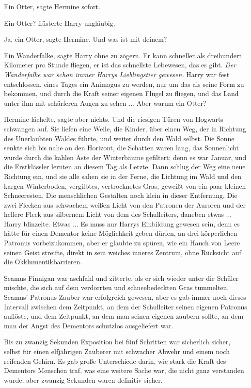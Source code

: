 \glqq{}Ein Otter\grqq{}, sagte Hermine sofort.

\glqq{}Ein Otter?\grqq{} flüsterte Harry ungläubig.

\glqq{}Ja, ein Otter\grqq{}, sagte Hermine. \glqq{}Und was ist mit deinem?\grqq{}

\glqq{}Ein Wanderfalke\grqq{}, sagte Harry ohne zu zögern. \glqq{}Er kann
schneller als dreihundert Kilometer pro Stunde fliegen, er ist das schnellste
Lebewesen, das es gibt.\grqq{}
\emph{Der Wanderfalke war schon immer Harrys Lieblingstier gewesen.}
Harry war fest entschlossen, eines Tages ein Animagus zu werden, nur um das als
seine Form zu bekommen, und durch die Kraft seiner eigenen Flügel zu fliegen,
und das Land unter ihm mit schärferen Augen zu sehen ... \glqq{}Aber warum ein
Otter?\grqq{}

Hermine lächelte, sagte aber nichts. Und die riesigen Türen von Hogwarts
schwangen auf. Sie liefen eine Weile, die Kinder, über einen Weg, der in
Richtung des Unerlaubten Waldes führte, und weiter durch den Wald selbst. Die
Sonne senkte sich bis nahe an den Horizont, die Schatten waren lang, das
Sonnenlicht wurde durch die kahlen Äste der Winterbäume gefiltert; denn es war
Januar, und die Erstklässler lernten an diesem Tag als Letzte. Dann schlug der
Weg eine neue Richtung ein, und sie alle sahen sie in der Ferne, die Lichtung im
Wald und den kargen Winterboden, vergilbtes, vertrocknetes Gras, geweißt von ein
paar kleinen Schneeresten. Die menschlichen Gestalten noch klein in dieser
Entfernung. Die zwei Flecken aus schwachem weißen Licht von den Patronen der
Auroren und der hellere Fleck aus silbernem Licht von dem des Schulleiters,
daneben etwas ... Harry blinzelte. Etwas ... Es muss nur Harrys Einbildung gewesen
sein, denn es hätte für einen Dementor keine Möglichkeit geben dürfen, an drei
körperlichen Patronus vorbeizukommen, aber er glaubte zu spüren, wie ein Hauch
von Leere seinen Geist streifte, direkt in sein weiches inneres Zentrum, ohne
Rücksicht auf die Okklumentikbarrieren.

Seamus Finnigan war aschfahl und zitterte, als er sich wieder unter die Schüler
mischte, die sich auf dem verdorrten und schneebedeckten Gras tummelten. Seamus'
Patronus-Zauber war erfolgreich gewesen, aber es gab immer noch dieses Intervall
zwischen dem Zeitpunkt, an dem der Schulleiter seinen eigenen Patronus auflöste,
und dem Zeitpunkt, an dem man seinen eigenen zaubern sollte, an dem man der
Angst des Dementors schutzlos ausgeliefert war.

Bis zu zwanzig Sekunden Exposition bei fünf Schritten war sicherlich sicher,
selbst für einen elfjährigen Zauberer mit schwacher Abwehr und einem noch
reifenden Gehirn. Es gab große Unterschiede darin, wie stark die Kraft des
Dementors Menschen traf, was eine weitere Sache war, die nicht ganz verstanden
wurde; aber zwanzig Sekunden waren definitiv sicher.

